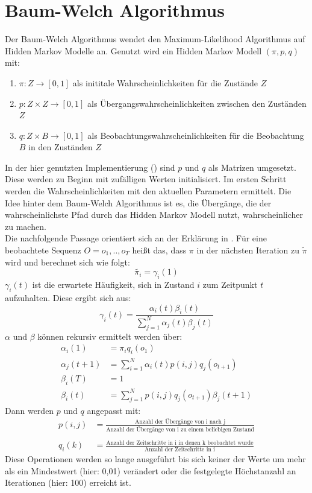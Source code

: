 \documentclass{article}
\begin{document}
\section{Baum-Welch Algorithmus}
\label{sec:BaumWelch}
Der Baum-Welch Algorithmus wendet den Maximum-Likelihood Algorithmus auf Hidden Markov Modelle an.
Genutzt wird ein Hidden Markov Modell $(\pi, p, q)$ mit:
\begin{enumerate}
\item $\pi: Z \rightarrow [0,1]$ als inititale Wahrscheinlichkeiten für die Zustände $Z$
\item $p: Z \times Z \rightarrow [0,1]$ als Übergangswahrscheinlichkeiten zwischen den Zuständen $Z$
\item $q: Z \times B \rightarrow [0,1]$ als Beobachtungswahrscheinlichkeiten für die Beobachtung $B$ in den Zuständen $Z$
\end{enumerate}
In der hier genutzten Implementierung (\cite{HmmlearnHmmlearn2021}) sind $p$ und $q$ als Matrizen umgesetzt.
Diese werden zu Beginn mit zufälligen Werten initialisiert.
Im ersten Schritt werden die Wahrscheinlichkeiten mit den aktuellen Parametern ermittelt.
Die Idee hinter dem Baum-Welch Algorithmus ist es, die Übergänge, die der wahrscheinlichste Pfad durch das Hidden Markov Modell nutzt, wahrscheinlicher zu machen.\\
Die nachfolgende Passage orientiert sich an der Erklärung in \cite{wunschBaumWelchAlgorithmusFu2001}.
Für eine beobachtete Sequenz $O = {o_1, .., o_T}$ heißt das, dass $\pi$ in der nächsten Iteration zu $\tilde{\pi}$ wird und berechnet sich wie folgt:
\[
\tilde{\pi_i} = \gamma_i(1)
\]
$\gamma_i(t)$ ist die erwartete Häufigkeit, sich in Zustand $i$ zum Zeitpunkt $t$ aufzuhalten.
Diese ergibt sich aus:
\[
\gamma_i(t) = \frac{\alpha_i(t)\beta_i(t)}{\sum_{j=1}^{N}\alpha_j(t)\beta_j(t)}
\]
$\alpha$ und $\beta$ können rekursiv ermittelt werden über:
\begin{align*}
\alpha_i(1) &= \pi_iq_i(o_1) \\
\alpha_j(t+1) &= \sum_{i=1}^{N}\alpha_i(t)p(i, j)q_j(o_{t+1})\\
\beta_i(T) &= 1 \\
\beta_i(t) &= \sum_{j=1}^{N}p(i, j)q_j(o_{t+1})\beta_j(t+1)
\end{align*}
Dann werden $p$ und $q$ angepasst mit:
\begin{align*}
p(i, j) &= \frac{\text{Anzahl der Übergänge von i nach j}}{\text{Anzahl der Übergänge von i zu einem beliebigen Zustand}}\\
\\
q_i(k) &= \frac{\text{Anzahl der Zeitschritte in i in denen k beobachtet wurde}}{\text{Anzahl der Zeitschritte in i}}
\end{align*}
Diese Operationen werden so lange ausgeführt bis sich keiner der Werte um mehr als ein Mindestwert (hier: 0,01) verändert oder die festgelegte Höchstanzahl an Iterationen (hier: 100) erreicht ist.
\end{document}
